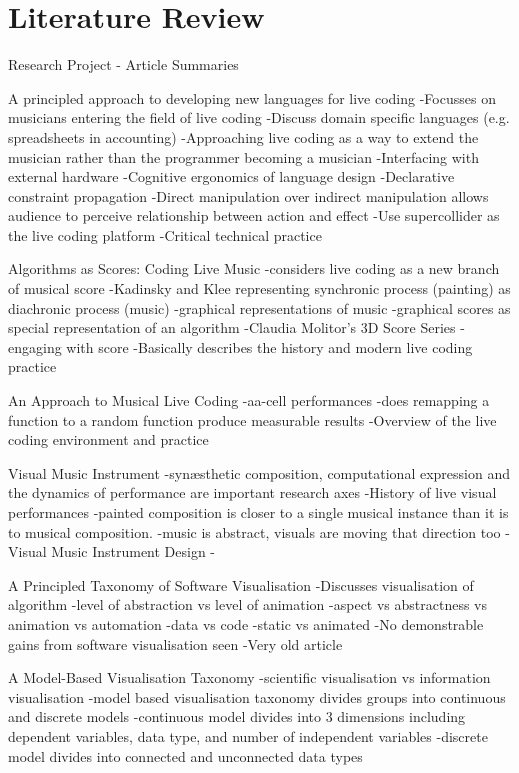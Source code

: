 
\chapter{Literature Review}
\label{cha:literaturereview}

Research Project - Article Summaries

A principled approach to developing new languages for live coding
-Focusses on musicians entering the field of live coding
-Discuss domain specific languages (e.g. spreadsheets in accounting)
-Approaching live coding as a way to extend the musician rather than the programmer becoming a musician
-Interfacing with external hardware
-Cognitive ergonomics of language design
-Declarative constraint propagation
-Direct manipulation over indirect manipulation allows audience to perceive relationship between action and effect
-Use supercollider as the live coding platform
-Critical technical practice

Algorithms as Scores: Coding Live Music
-considers live coding as a new branch of musical score
-Kadinsky and Klee representing synchronic process (painting) as diachronic process (music)
-graphical representations of music
-graphical scores as special representation of an algorithm
-Claudia Molitor’s 3D Score Series - engaging with score
-Basically describes the history and modern live coding practice

An Approach to Musical Live Coding
-aa-cell performances
-does remapping a function to a random function produce measurable results
-Overview of the live coding environment and practice

Visual Music Instrument
-synæsthetic composition, computational expression and the dynamics of performance are important research axes
-History of live visual performances
-painted composition is closer to a single musical instance than it is to musical composition.
-music is abstract, visuals are moving that direction too
-Visual Music Instrument Design
-

A Principled Taxonomy of Software Visualisation
-Discusses visualisation of algorithm
-level of abstraction vs level of animation
-aspect vs abstractness vs animation vs automation
-data vs code
-static vs animated
-No demonstrable gains from software visualisation seen
-Very old article

A Model-Based Visualisation Taxonomy
-scientific visualisation vs information visualisation
-model based visualisation taxonomy divides groups into continuous and discrete models
-continuous model divides into 3 dimensions including dependent variables, data type, and number of independent variables
-discrete model divides into connected and unconnected data types

